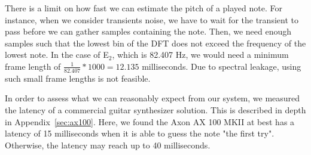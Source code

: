 \documentclass[a4paper,10pt,twocolumn]{article}
\newcommand{\note}[2]{#1${}_{#2}$}
\begin{document}

There is a limit on how fast we can estimate the pitch of a played note. For instance, when we consider transients noise, we have to wait for the transient to pass before we can gather samples containing the note. Then, we need enough samples such that the lowest bin of the DFT does not exceed the frequency of the lowest note. In the case of \note{E}{2}, which is 82.407 Hz, we would need a minimum frame length of $ \frac{1}{82.407} * 1000 = 12.135 $ milliseconds. Due to spectral leakage, using such small frame lengths is not feasible. %

In order to assess what we can reasonably expect from our system, we measured the latency of a commercial guitar synthesizer solution. This is described in depth in Appendix~\ref{sec:ax100}. Here, we found the Axon AX 100 MKII at best has a latency of 15 milliseconds when it is able to guess the note "the first try". Otherwise, the latency may reach up to 40 milliseconds.

\end{document}
